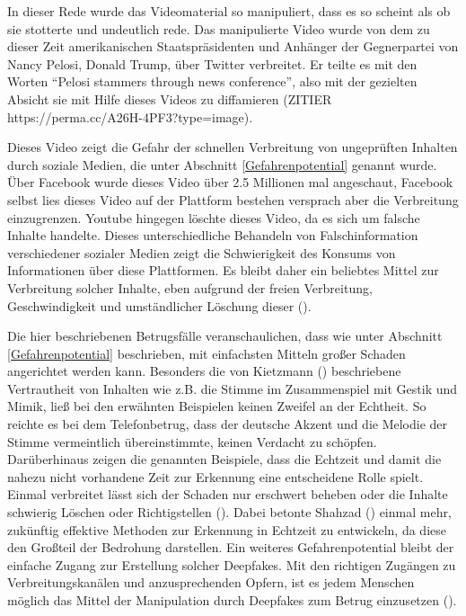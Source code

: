 In dieser Rede wurde das Videomaterial so manipuliert, dass es so scheint als ob sie stotterte und undeutlich rede.
Das manipulierte Video wurde von dem zu dieser Zeit amerikanischen Staatspräsidenten und Anhänger der Gegnerpartei von Nancy Pelosi, Donald Trump, über Twitter verbreitet.
Er teilte es mit den Worten ``Pelosi stammers through news conference'', also mit der gezielten Absicht sie mit Hilfe dieses Videos zu diffamieren (ZITIER https://perma.cc/A26H-4PF3?type=image).
\par
Dieses Video zeigt die Gefahr der schnellen Verbreitung von ungeprüften Inhalten durch soziale Medien, die unter Abschnitt \ref{Gefahrenpotential} genannt wurde.
Über Facebook wurde dieses Video über 2.5 Millionen mal angeschaut, Facebook selbst lies dieses Video auf der Plattform bestehen versprach aber die Verbreitung einzugrenzen.
Youtube hingegen löschte dieses Video, da es sich um falsche Inhalte handelte.
Dieses unterschiedliche Behandeln von Falschinformation verschiedener sozialer Medien zeigt die Schwierigkeit des Konsums von Informationen über diese Plattformen.
Es bleibt daher ein beliebtes Mittel zur Verbreitung solcher Inhalte, eben aufgrund der freien Verbreitung, Geschwindigkeit und umständlicher Löschung dieser (\cite{Appel2022}).
\par
Die hier beschriebenen Betrugsfälle veranschaulichen, dass wie unter Abschnitt \ref{Gefahrenpotential} beschrieben, mit einfachsten Mitteln großer Schaden angerichtet werden kann.
Besonders die von Kietzmann (\cite{Kietzmann2020}) beschriebene Vertrautheit von Inhalten wie z.B. die Stimme im Zusammenspiel mit Gestik und Mimik, ließ bei den erwähnten Beispielen keinen Zweifel an der Echtheit.
So reichte es bei dem Telefonbetrug, dass der deutsche Akzent und die Melodie der Stimme vermeintlich übereinstimmte, keinen Verdacht zu schöpfen.
Darüberhinaus zeigen die genannten Beispiele, dass die Echtzeit und damit die nahezu nicht vorhandene Zeit zur Erkennung eine entscheidene Rolle spielt.
Einmal verbreitet lässt sich der Schaden nur erschwert beheben oder die Inhalte schwierig Löschen oder Richtigstellen (\cite{Shahzad2022}).
Dabei betonte Shahzad (\cite{Shahzad2022}) einmal mehr, zukünftig effektive Methoden zur Erkennung in Echtzeit zu entwickeln, da diese den Großteil der Bedrohung darstellen.
Ein weiteres Gefahrenpotential bleibt der einfache Zugang zur Erstellung solcher Deepfakes.
Mit den richtigen Zugängen zu Verbreitungskanälen und anzusprechenden Opfern, ist es jedem Menschen möglich das Mittel der Manipulation durch Deepfakes zum Betrug einzusetzen (\cite{Appel2022}).


